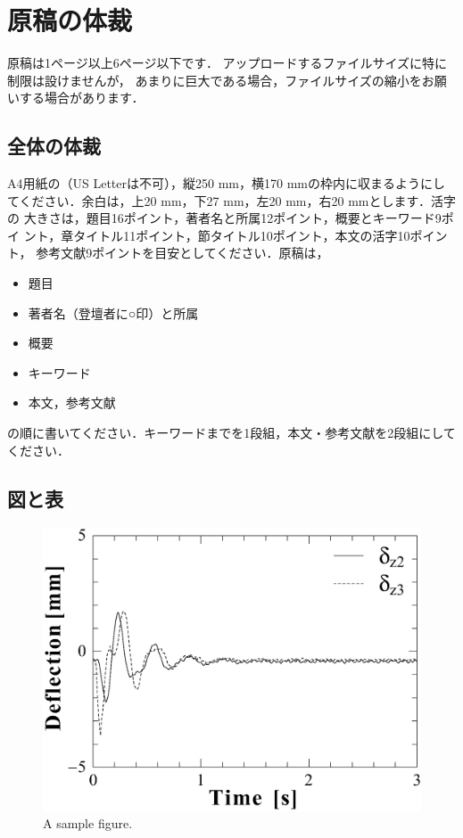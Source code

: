 \documentclass{jarticle}
\begin{document}
\section{原稿の体裁}

原稿は1ページ以上6ページ以下です．
アップロードするファイルサイズに特に制限は設けませんが，
あまりに巨大である場合，ファイルサイズの縮小をお願いする場合があります．

\subsection{全体の体裁}

A4用紙の（US Letterは不可），縦250 mm，横170 mmの枠内に収まるようにし
てください．余白は，上20 mm，下27 mm，左20 mm，右20 mmとします．活字の
大きさは，題目16ポイント，著者名と所属12ポイント，概要とキーワード9ポイ
ント，章タイトル11ポイント，節タイトル10ポイント，本文の活字10ポイント，
参考文献9ポイントを目安としてください．原稿は，
%
\begin{itemize}
  \setlength{\topsep}{0pt}
  \setlength{\partopsep}{0pt}
  \setlength{\itemsep}{0pt}
  \setlength{\parsep}{0pt}
  \setlength{\parskip}{1pt plus 1pt minus 1pt}
  \item 題目
  \item 著者名（登壇者に○印）と所属
  \item 概要
  \item キーワード
  \item 本文，参考文献
\end{itemize}
%
の順に書いてください．キーワードまでを1段組，本文・参考文献を2段組にしてください． 

\subsection{図と表}

\begin{figure}[t]
  \centering
\ifLaTeXe
  \includegraphics[width=0.5\linewidth]{fig1}
\else
\fi
  \caption{A sample figure.}
  \label{fig:samplefig}
\end{figure}
\end{document}
